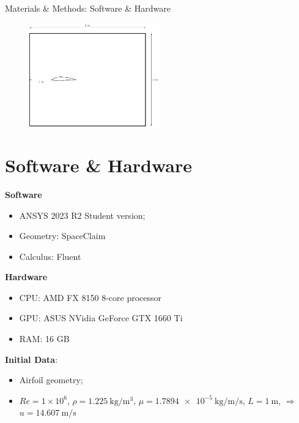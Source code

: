 \documentclass[english,10pt,a4paper,twoside]{beamer}
\begin{document}
	\begin{frame}{Materials \& Methods: Software \& Hardware}
		\begin{figure}
			\centering
			\includegraphics[width=0.5\textwidth]{figures/geometry}
			\label{fig:geometry}
		\end{figure}
		
		\section{Software \& Hardware}
		\textbf{Software}
		\begin{itemize}
			\item ANSYS 2023 R2 Student version;
			\item Geometry: SpaceClaim
			\item Calculus: Fluent
		\end{itemize}
		\textbf{Hardware}
		\begin{itemize}
			\item CPU: AMD FX 8150 8-core processor 
			\item GPU: ASUS NVidia GeForce GTX 1660 Ti
			\item RAM: 16 GB
		\end{itemize}
		\textbf{Initial Data}:
		\begin{itemize}
			\item Airfoil geometry;
			\item $Re = 1 \times 10^6$, $\rho = \SI{1.225}{\kilogram\per\cubic\meter}$, $\mu = \SI{1.7894e-5}{\kilogram\per\meter\per\second}$, $L = \SI{1}{\meter}$, $\Rightarrow$ \alert{$u = \SI{14.607}{\meter\per\second}$}
		\end{itemize}
		
	\end{frame}
	
\end{document}
